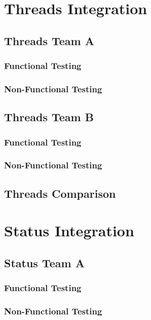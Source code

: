 \documentclass[12pt, oneside]{article}
\begin{document}
\section{Threads Integration}
	\subsection{Threads Team A}	
		\subsubsection{Functional Testing}
			
		\subsubsection{Non-Functional Testing }
			
	
	\subsection{Threads Team B}	
		\subsubsection{Functional Testing}
			
		\subsubsection{Non-Functional Testing }
			
	
	\subsection{Threads Comparison}
\newpage 
\section{Status Integration}
	\subsection{Status Team A}	
		\subsubsection{Functional Testing}
			
		\subsubsection{Non-Functional Testing }
			
	
\end{document}
